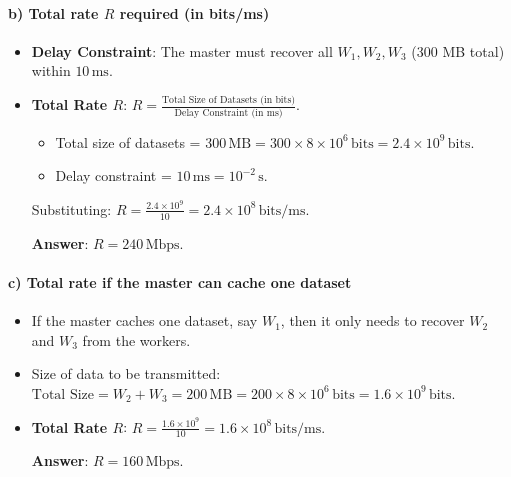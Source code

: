 \documentclass[11pt]{article}
\providecommand{\tightlist}{%
      \setlength{\itemsep}{0pt}\setlength{\parskip}{0pt}}
\begin{document}
\paragraph{\texorpdfstring{\textbf{b) Total rate \(R\) required (in
bits/ms)}}{b) Total rate R required (in bits/ms)}}\label{b-total-rate-r-required-in-bitsms}

\begin{itemize}
\item
  \textbf{Delay Constraint}: The master must recover all
  \(W_1, W_2, W_3\) (300 MB total) within \(10 \, \text{ms}\).
\item
  \textbf{Total Rate \(R\)}:
  \(R = \frac{\text{Total Size of Datasets (in bits)}}{\text{Delay Constraint (in ms)}}.\)

  \begin{itemize}
  \tightlist
  \item
    Total size of datasets =
    \(300 \, \text{MB} = 300 \times 8 \times 10^6 \, \text{bits} = 2.4 \times 10^9 \, \text{bits}\).
  \item
    Delay constraint = \(10 \, \text{ms} = 10^{-2} \, \text{s}\).
  \end{itemize}

  Substituting:
  \(R = \frac{2.4 \times 10^9}{10} = 2.4 \times 10^8 \, \text{bits/ms}.\)

  \textbf{Answer}: \(R = 240 \, \text{Mbps}\).
\end{itemize}

\paragraph{\texorpdfstring{\textbf{c) Total rate if the master can cache
one
dataset}}{c) Total rate if the master can cache one dataset}}\label{c-total-rate-if-the-master-can-cache-one-dataset}

\begin{itemize}
\item
  If the master caches one dataset, say \(W_1\), then it only needs to
  recover \(W_2\) and \(W_3\) from the workers.
\item
  Size of data to be transmitted:
  \(\text{Total Size} = W_2 + W_3 = 200 \, \text{MB} = 200 \times 8 \times 10^6 \, \text{bits} = 1.6 \times 10^9 \, \text{bits}.\)
\item
  \textbf{Total Rate \(R\)}:
  \(R = \frac{1.6 \times 10^9}{10} = 1.6 \times 10^8 \, \text{bits/ms}.\)

  \textbf{Answer}: \(R = 160 \, \text{Mbps}\).
\end{itemize}
\end{document}
